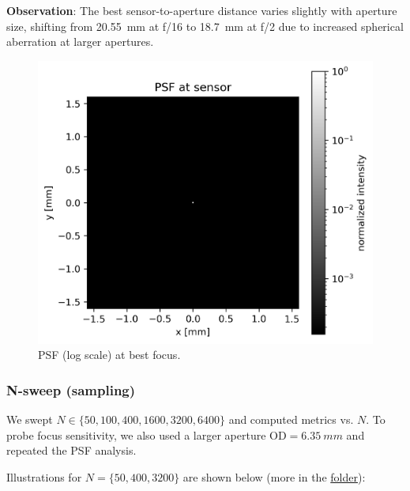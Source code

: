 \documentclass[11pt,a4paper]{article}
\begin{document}
	\textbf{Observation}: The best sensor-to-aperture distance varies slightly with aperture size, shifting from \SI{20.55}{mm} at f/16 to \SI{18.7}{mm} at f/2 due to increased spherical aberration at larger apertures.
	
	\begin{figure}[H]
		\centering
		\includegraphics[width=\linewidth]{biconvex_psf_log.png}
		\caption{PSF (log scale) at best focus.}
	\end{figure}
	
	\subsubsection*{N-sweep (sampling)}\label{n-sweep-sampling}
	
	We swept \(N \in \{50, 100, 400, 1600, 3200, 6400\}\) and computed metrics vs. \(N\).
	To probe focus sensitivity, we also used a larger aperture \(\mathrm{OD} = \SI{6.35}{mm}\) and repeated the PSF analysis.
	
	Illustrations for \(N=\{50, 400, 3200\}\) are shown below (more in the \href{../out/sweep_N}{folder}):
	
\end{document}

